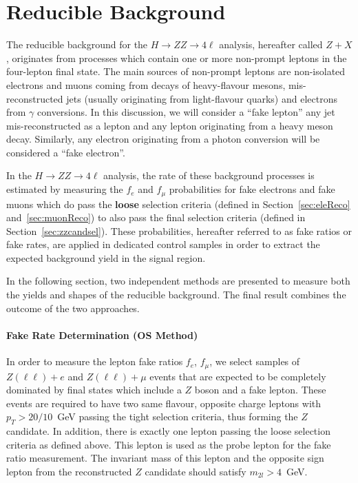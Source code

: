 \section{Reducible Background}
\label{sec:zxIntr}
%

The reducible background for the $H\to ZZ\to 4\ell $ analysis, hereafter called $Z+X$, originates from processes which contain one or more non-prompt leptons in the four-lepton final state. 
The main sources of non-prompt leptons are non-isolated electrons and muons coming from decays of heavy-flavour mesons, mis-reconstructed jets (usually originating from light-flavour quarks) and electrons from $\gamma$ conversions. 
In this discussion, we will consider a ``fake lepton'' any jet mis-reconstructed as a lepton and any lepton originating from a heavy meson decay.
Similarly, any electron originating from a photon conversion will be considered a ``fake electron''.

In the $H\to ZZ\to 4\ell $ analysis, the rate of these background processes is estimated by measuring the $f_{e}$ and $f_{\mu}$ probabilities for fake electrons and fake muons which do pass the {\bf loose} selection criteria (defined in Section~\ref{sec:eleReco} and~\ref{sec:muonReco}) to also pass the final selection criteria (defined in Section~\ref{sec:zzcandsel}).  
These probabilities, hereafter referred to as fake ratios or fake rates, are applied in dedicated control samples in order to extract the expected background yield in the signal region. 

In the following section, two independent methods are presented to measure both the yields and shapes of the reducible background. The final result combines the outcome of the two approaches. 

\paragraph{Fake Rate Determination (OS Method)}
In order to measure the lepton fake ratios $f_{e}$, $f_{\mu}$, we select samples of $Z(\ell\ell)+e$ and $Z(\ell\ell)+\mu$ events that are expected to be completely dominated by final states which include a $Z$ boson and a fake lepton. 
These events are required to have two same flavour, opposite charge leptons with $p_{T} > 20/10$~GeV passing the tight selection criteria, thus forming the $Z$ candidate. In addition, there is exactly one lepton passing the loose selection criteria as defined above. 
This lepton is used as the probe lepton for the fake ratio measurement. The invariant mass of this lepton and the opposite sign lepton from the reconstructed $Z$ candidate should satisfy $m_{2l} > 4$~GeV. 

